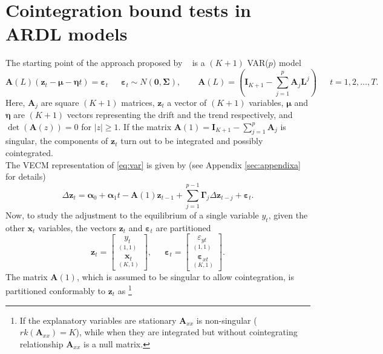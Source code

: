 \section{Cointegration bound tests in ARDL models}\label{sec:cointegration}
The starting point of the approach proposed by ~\cite{pesaran2001} is a $(K+1)$ VAR($p$) model
\begin{equation}\label{eq:var}
\mathbf{A}(L)(\mathbf{z}_t-\boldsymbol{\mu}-\boldsymbol{\eta}t)=\boldsymbol{\varepsilon}_t \enspace \enspace \enspace \boldsymbol{\varepsilon}_t\sim N(\mathbf{0}, \boldsymbol{\Sigma}),\qquad\mathbf{A}(L)=\left(\mathbf{I}_{K+1}-  \sum_{j=1}^{p}\mathbf{A}_j\mathbf{L}^j\right)
\enspace \enspace \enspace t=1,2,\dots,T.
\end{equation}
Here, $\mathbf{A}_j$ are square $(K+1)$ matrices, $\mathbf{z}_t$ a vector of  $(K+1)$ variables, 
$\boldsymbol{\mu}$ and $\boldsymbol{\eta}$ are $(K+1)$ vectors representing the drift and the trend respectively, and $\det(\mathbf{A}(z))=0$ for $|z| \geq 1$. If the matrix $\mathbf{A}(1)=\mathbf{I}_{K+1}-\sum_{j=1}^{p}\mathbf{A}_{j}$ is singular, the components of $\mathbf{z}_t$ turn out to be integrated and possibly cointegrated.\\
The VECM representation of \eqref{eq:var} is given by (see Appendix \ref{sec:appendixa} for details)
\begin{equation}\label{eq:vecm}
\Delta\mathbf{z}_t=\boldsymbol{\alpha}_{0}+\boldsymbol{\alpha}_{1}t-\mathbf{A}(1)\mathbf{z}_{t-1}+\sum_{j=1}^{p-1}\boldsymbol{\Gamma}_{j}\Delta \mathbf{z}_{t-j}+\boldsymbol{\varepsilon}_t.
\end{equation}
Now, to study the adjustment to the equilibrium of a single variable $y_t$, given the other $\mathbf{x}_t$ variables, the vectors $\mathbf{z}_t$ and $\boldsymbol{\varepsilon}_t$ are partitioned
\begin{equation}\label{eq:vecpart}
\mathbf{z}_t=\begin{bmatrix}
\underset{(1,1)}{y_{t}}  \\ \underset{(K,1)}{\mathbf{x}_{t}}  
\end{bmatrix}, \enspace \enspace \enspace \boldsymbol{\varepsilon}_t=\begin{bmatrix}
\underset{(1,1)}{\varepsilon_{yt}} \\  \underset{(K,1)}{\boldsymbol{\varepsilon}_{xt}} 
\end{bmatrix}.
\end{equation}
 The matrix $\mathbf{A}(1)$, which is assumed to be singular to allow cointegration, is partitioned conformably to $\mathbf{z}_{t}$ as \footnote{ If the explanatory variables are stationary $\mathbf{A}_{xx}$ is non-singular ($rk(\mathbf{A}_{xx})=K$), while when they are integrated but without cointegrating relationship $\mathbf{A}_{xx}$ is a null matrix.} \\

